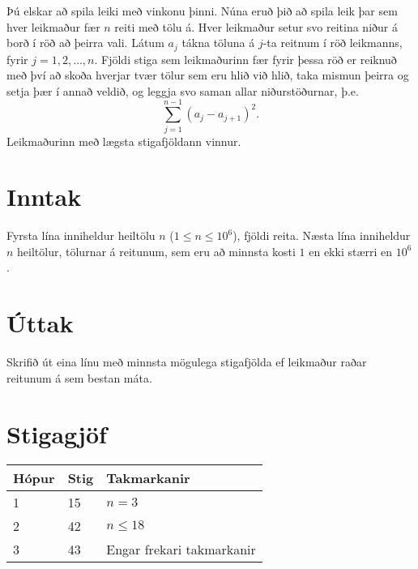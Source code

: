 Þú elskar að spila leiki með vinkonu þinni.
Núna eruð þið að spila leik þar sem hver leikmaður fær $n$ reiti með tölu á.
Hver leikmaður setur svo reitina niður á borð í röð að þeirra vali.
Látum $a_j$ tákna töluna á $j$-ta reitnum í röð leikmanns, fyrir $j=1,2,\ldots,n$.
Fjöldi stiga sem leikmaðurinn fær fyrir þessa röð er reiknuð með því að skoða
hverjar tvær tölur sem eru hlið við hlið, taka mismun þeirra og setja þær í
annað veldið, og leggja svo saman allar niðurstöðurnar, þ.e.\
\[
	\sum_{j = 1}^{n - 1} (a_j - a_{j + 1})^2.
\]
Leikmaðurinn með lægsta stigafjöldann vinnur.

\section*{Inntak}
Fyrsta lína inniheldur heiltölu $n$ ($1\leq n\leq 10^6$), fjöldi reita.
Næsta lína inniheldur $n$ heiltölur, tölurnar á reitunum, sem eru að minnsta kosti $1$ en ekki stærri en $10^6$.

\section*{Úttak}
Skrifið út eina línu með minnsta mögulega stigafjölda ef leikmaður raðar reitunum á sem bestan máta.

\section*{Stigagjöf}
\begin{tabular}{|l|l|l|}
\hline
Hópur & Stig & Takmarkanir \\ \hline
1     & 15   & $n = 3$ \\ \hline
2     & 42   & $n \leq 18$ \\ \hline
3     & 43   & Engar frekari takmarkanir\\ \hline
\end{tabular}

